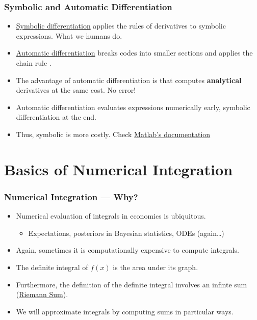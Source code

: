 \documentclass[11pt,xcolor={svgnames},aspectratio=169,usepdftitle=false,notheorems]{beamer}
\begin{document}
\begin{frame}
  \frametitle{Symbolic and Automatic Differentiation}
\begin{itemize}
  \item \href{https://www.mathworks.com/help/symbolic/diff.html\#btwol6i-2}{Symbolic differentiation} applies the rules of derivatives to symbolic expressions. What we humans do.
  \item \href{https://en.wikipedia.org/wiki/Automatic_differentiation}{Automatic differentiation} breaks codes into smaller sections and applies the chain rule \parencite[See Chapter~4]{kwon2019julia}.
  \item The advantage of automatic differentiation is that computes \alert{\textbf{analytical}} derivatives at the same cost. No error!
  \item Automatic differentiation evaluates expressions numerically early, symbolic differentiation at the end.
  \item Thus, symbolic is more costly. Check \href{https://www.mathworks.com/help/deeplearning/ug/deep-learning-with-automatic-differentiation-in-matlab.html}{Matlab's documentation}
\end{itemize}
\end{frame}

\section{Basics of Numerical Integration}

\begin{frame}
  \frametitle{Numerical Integration --- Why?}
\begin{itemize}
  \item Numerical evaluation of integrals in economics is ubiquitous.
  \begin{itemize}
    \item Expectations, posteriors in Bayesian statistics, ODEs (again\ldots)
  \end{itemize}
  \item Again, sometimes it is computationally expensive to compute integrals.
  \item The definite integral of $f(x)$ is the area under its graph.
  \item Furthermore, the definition of the definite integral involves an infinte sum (\href{https://en.wikipedia.org/wiki/Riemann_sum}{Riemann Sum}).
  \item We will approximate integrals by computing sums in particular ways.
\end{itemize}
\end{frame}
\end{document}
